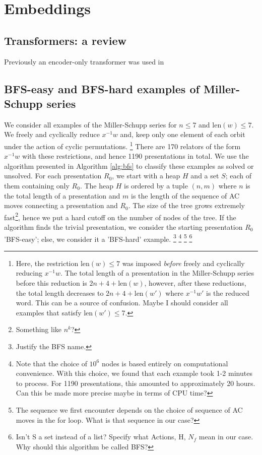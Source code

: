 
\section{Embeddings}

\subsection{Transformers: a review}

Previously an encoder-only transformer was used in

\subsection{BFS-easy and BFS-hard examples of Miller-Schupp series}

We consider all examples of the Miller-Schupp series for $n \leq 7$ and $\text{len}(w) \leq 7$. We freely and cyclically reduce $x^{-1}w$ and, keep only one element of each orbit under the action of cyclic permutations.
\footnote{Here, the restriction len$(w) \leq 7$ was imposed \textit{before} freely and cyclically reducing $x^{-1}w$. The total length of a presentation in the Miller-Schupp series before this reduction is $2n+4+\text{len}(w)$, however, after these reductions, the total length decreases to $2n+4+\text{len}(w')$ where $x^{-1}w'$ is the reduced word. This can be a source of confusion. Maybe I should consider all examples that satisfy $\text{len}(w') \leq 7$.}
There are 170 relators of the form $x^{-1}w$ with these restrictions, and hence 1190 presentations in total. We use the algorithm presented in Algorithm \autoref{alg:bfs} to classify these examples as solved or unsolved. For each presentation $R_0$, we start with a heap $H$ and a set $S$; each of them containing only $R_0$. The heap $H$ is ordered by a tuple $(n, m)$ where $n$ is the total length of a presentation and $m$ is the length of the sequence of AC moves connecting a presentation and $R_0$. The size of the tree grows extremely fast\footnote{Something like $n^k$?}, hence we put a hard cutoff on the number of nodes of the tree. If the algorithm finds the trivial presentation, we consider the starting presentation $R_0$ 'BFS-easy'; else, we consider it a 'BFS-hard' example.
\footnote{Justify the BFS name.}
\footnote{Note that the choice of $10^6$ nodes is based entirely on computational convenience. With this choice, we found that each example took 1-2 minutes to process. For 1190 presentations, this amounted to approximately 20 hours. Can this be made more precise maybe in terms of CPU time?}
\footnote{The sequence we first encounter depends on the choice of sequence of AC moves in the for loop. What is that sequence in our case?}
\footnote{Isn't S a set instead of a list? Specify what Actions, H, $N_f$ mean in our case. Why should this algorithm be called BFS?}

